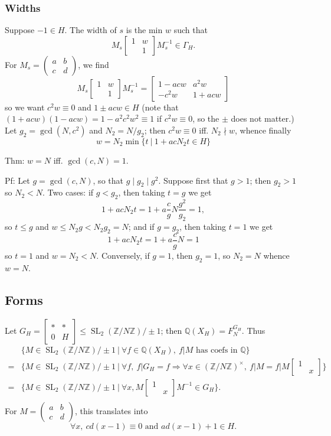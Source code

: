 \documentclass[12pt]{article}
\newcommand{\Z}{\mathbb{Z}}
\newcommand{\Q}{\mathbb{Q}}
\newcommand{\SL}{\operatorname{SL}}
\newcommand{\Frob}{\operatorname{Frob}}
\newcommand{\matabcd}{\left( \begin{smallmatrix} a & b \\ c & d \end{smallmatrix} \right)}
\newcommand{\mact}{\big\vert}
\newcommand{\smat}[4]{\left[ \begin{smallmatrix} #1 & #2 \\ #3 & #4 \end{smallmatrix} \right]}
\newcommand{\mat}[4]{\left[ \begin{matrix} #1 & #2 \\ #3 & #4 \end{matrix} \right]}
\theoremstyle{definition}
\begin{document}
\subsubsection{Widths}

Suppose $-1 \in H$. The width of $s$ is the min $w$ such that
\[ M_s \smat{1}{w}{}{1} M_s^{-1} \in \Gamma_H. \]
For $M_s = \matabcd$, we find
\[ M_s \smat{1}{w}{}{1} M_s^{-1} = \mat{1-acw}{a^2w}{-c^2w}{1+acw} \]
so we want $c^2 w \equiv 0$ and $1 \pm acw \in H$ (note that $(1+acw)(1-acw)=1-a^2c^2w^2 \equiv 1$ if $c^2w \equiv 0$, so the $\pm$ does not matter.) Let $g_2 = \gcd(N,c^2)$ and $N_2 = N/g_2$; then $c^2 w \equiv 0$ iff. $N_2 \nmid w$, whence finally
\[ w = N_2 \min \{ t \ \vert \ 1+acN_2 t \in H \} \]

Thm: $w=N$ iff. $\gcd(c,N)=1$.

Pf: Let $g=\gcd(c,N)$, so that $ g \mid g_2 \mid g^2$. Suppose first that $g>1$; then $g_2>1$ so $N_2<N$. Two cases: if $g < g_2$, then taking $t=g$ we get
\[ 1+acN_2t = 1+a \frac{c}g N \frac{g^2}{g_2} = 1, \]
so $t \leqslant g$ and $w \leqslant N_2 g < N_2 g_2 = N$; and if $g=g_2$, then taking $t=1$ we get
\[ 1+acN_2t = 1+a \frac{c}g N = 1 \]
so $t=1$ and $w=N_2 < N$. Conversely, if $g=1$, then $g_2=1$, so $N_2=N$ whence $w=N$.

\subsection{Forms}

% 
%
%

Let $G_H = \smat{*}{*}{0}{H} \leqslant \SL_2(\Z/N\Z)/\pm1$; then $\Q(X_H) = F_N^{G_H}$. Thus
\begin{align*}  & \{ M \in \SL_2(\Z/N\Z)/\pm1 \ \vert \ \forall f \in \Q(X_H), \ f \mact M  \text{ has coefs in } \Q \} \\
= & \{ M \in \SL_2(\Z/N\Z)/\pm1 \ \vert \ \forall f, \ f \mact G_H = f \Rightarrow \forall x \in (\Z/N\Z)^\times, \ f \mact M = f \mact M \smat{1}{}{}{x} \} \\
= & \{ M \in \SL_2(\Z/N\Z)/\pm1 \ \vert \ \forall x, M \smat{1}{}{}{x} M^{-1} \in G_H \}. \\
\end{align*}
For $M=\matabcd$, this translates into
\[ \forall x, \ cd(x-1) \equiv 0 \text{ and } ad(x-1)+1 \in H. \]
\end{document}

